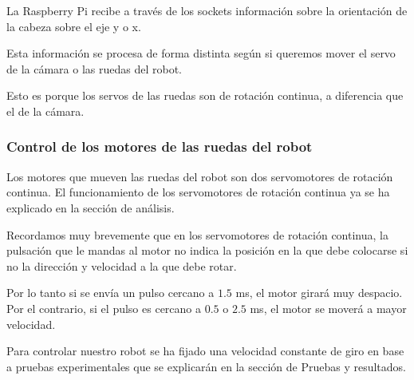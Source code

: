 \documentclass[twoside, 11pt]{epstfg}
\begin{document}
%
%
%
%
%
%
%
%



La Raspberry Pi recibe a través de los sockets información sobre la orientación de la cabeza sobre el eje y o x.


Esta información se procesa de forma distinta según si queremos mover el servo de la cámara o las ruedas del robot.

Esto es porque los servos de las ruedas son de rotación continua, a diferencia que el de la cámara.

\subsubsection{\textbf{Control de los motores de las ruedas del robot}}

Los motores que mueven las ruedas del robot son dos servomotores de rotación continua. El funcionamiento de los servomotores de rotación continua ya se ha explicado en la sección de análisis.

Recordamos muy brevemente que en los servomotores de rotación continua, la pulsación que le mandas al motor no indica la posición en la que debe colocarse si no la dirección y velocidad a la que debe rotar.

Por lo tanto si se envía un pulso cercano a $1.5$ ms, el motor girará muy despacio. Por el contrario, si el pulso es cercano a $0.5$ o $2.5$ ms, el motor se moverá a mayor velocidad.

Para controlar nuestro robot se ha fijado una velocidad constante de giro en base a pruebas experimentales que se explicarán en la sección de Pruebas y resultados.
\end{document}
